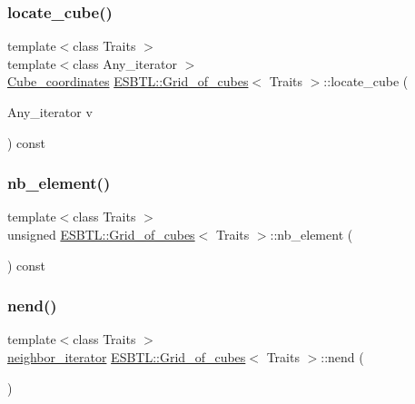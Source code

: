 \subsubsection{\texorpdfstring{locate\+\_\+cube()}{locate\_cube()}}
{\footnotesize\ttfamily template$<$class Traits $>$ \\
template$<$class Any\+\_\+iterator $>$ \\
\hyperlink{structESBTL_1_1Grid__of__cubes_ad55c84346bab961e08d95e494551d07d}{Cube\+\_\+coordinates} \hyperlink{structESBTL_1_1Grid__of__cubes}{E\+S\+B\+T\+L\+::\+Grid\+\_\+of\+\_\+cubes}$<$ Traits $>$\+::locate\+\_\+cube (\begin{DoxyParamCaption}\item[{Any\+\_\+iterator}]{v }\end{DoxyParamCaption}) const\hspace{0.3cm}{\ttfamily [inline]}}

\mbox{\label{structESBTL_1_1Grid__of__cubes_ac11f4d98c90bb979290a7c3976d5bf7e}} 
\subsubsection{\texorpdfstring{nb\+\_\+element()}{nb\_element()}}
{\footnotesize\ttfamily template$<$class Traits $>$ \\
unsigned \hyperlink{structESBTL_1_1Grid__of__cubes}{E\+S\+B\+T\+L\+::\+Grid\+\_\+of\+\_\+cubes}$<$ Traits $>$\+::nb\+\_\+element (\begin{DoxyParamCaption}{ }\end{DoxyParamCaption}) const\hspace{0.3cm}{\ttfamily [inline]}}

\mbox{\label{structESBTL_1_1Grid__of__cubes_a80598e81cc5bfeccaf8650978cf11f19}} 
\subsubsection{\texorpdfstring{nend()}{nend()}}
{\footnotesize\ttfamily template$<$class Traits $>$ \\
\hyperlink{classESBTL_1_1Grid__of__cubes_1_1neighbor__iterator}{neighbor\+\_\+iterator} \hyperlink{structESBTL_1_1Grid__of__cubes}{E\+S\+B\+T\+L\+::\+Grid\+\_\+of\+\_\+cubes}$<$ Traits $>$\+::nend (\begin{DoxyParamCaption}{ }\end{DoxyParamCaption})\hspace{0.3cm}{\ttfamily [inline]}}

